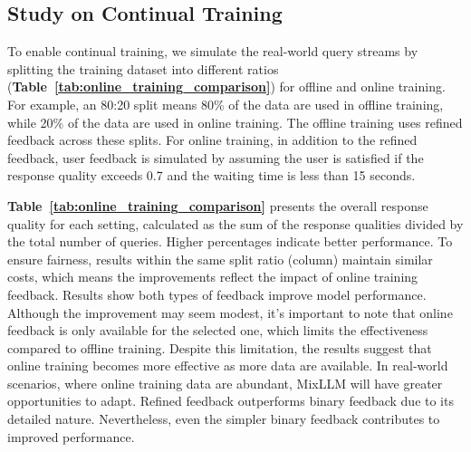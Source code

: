 


\subsection{Study on Continual Training}
\label{exp_online}

To enable continual training, we simulate the real-world query streams by splitting the training dataset into different ratios (\textbf{Table~\ref{tab:online_training_comparison}}) for offline and online training.
For example, an 80:20 split means 80\% of the data are used in offline training, while 20\% of the data are used in online training.
The offline training uses refined feedback across these splits. 
For online training, 
in addition to the refined feedback, user feedback is simulated by assuming the user is satisfied if the response quality exceeds 0.7 and the waiting time is less than 15 seconds.



\textbf{Table~\ref{tab:online_training_comparison}} presents the overall response quality for each setting, calculated as the sum of the response qualities divided by the total number of queries. 
Higher percentages indicate better performance. %
To ensure fairness, results within the same split ratio (column) maintain similar costs, which means the improvements reflect the impact of online training feedback.
Results show both types of feedback improve model performance. 
Although the improvement may seem modest, it’s important to note that online feedback is only available for the selected one, which limits the effectiveness compared to offline training. 
Despite this limitation, the results suggest that online training becomes more effective as more data are available. In real-world scenarios, where online training data are abundant, MixLLM will have greater opportunities to adapt.
Refined feedback outperforms binary feedback due to its detailed nature. Nevertheless, even the simpler binary feedback contributes to improved performance.


